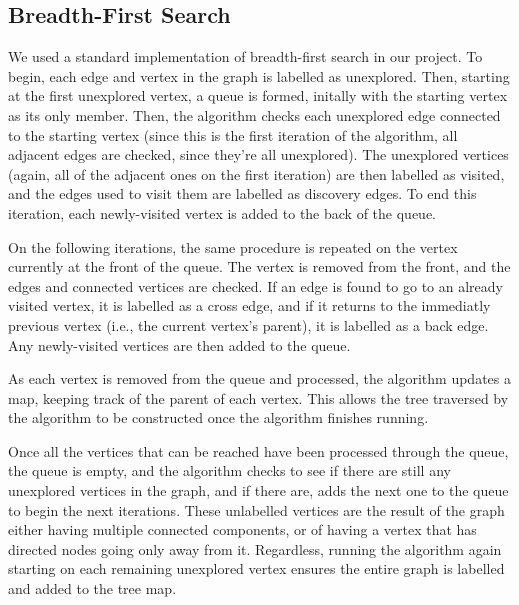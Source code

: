\documentclass[titlepage]{article}
\begin{document}
\begin{multicols*}{2}
            \subsection{Breadth-First Search}
                We used a standard implementation of breadth-first search in our project. To begin, each edge and vertex in the graph is labelled as unexplored. Then, starting at the first unexplored vertex, a queue is formed, initally with the starting vertex as its only member. Then, the algorithm checks each unexplored edge connected to the starting vertex (since this is the first iteration of the algorithm, all adjacent edges are checked, since they're all unexplored). The unexplored vertices (again, all of the adjacent ones on the first iteration) are then labelled as visited, and the edges used to visit them are labelled as discovery edges. To end this iteration, each newly-visited vertex is added to the back of the queue. \par
                On the following iterations, the same procedure is repeated on the vertex currently at the front of the queue. The vertex is removed from the front, and the edges and connected vertices are checked. If an edge is found to go to an already visited vertex, it is labelled as a cross edge, and if it returns to the immediatly previous vertex (i.e., the current vertex's parent), it is labelled as a back edge. Any newly-visited vertices are then added to the queue. \par
                As each vertex is removed from the queue and processed, the algorithm updates a map, keeping track of the parent of each vertex. This allows the tree traversed by the algorithm to be constructed once the algorithm finishes running. \par
                Once all the vertices that can be reached have been processed through the queue, the queue is empty, and the algorithm checks to see if there are still any unexplored vertices in the graph, and if there are, adds the next one to the queue to begin the next iterations. These unlabelled vertices are the result of the graph either having multiple connected components, or of having a vertex that has directed nodes going only away from it. Regardless, running the algorithm again starting on each remaining unexplored vertex ensures the entire graph is labelled and added to the tree map.

\end{multicols*}
\end{document}
